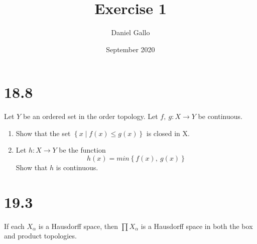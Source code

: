 \documentclass{article}
\title{Exercise 1}
\author{Daniel Gallo}
\date{September 2020}
\begin{document}
\maketitle
\section*{18.8}
Let $Y$ be an ordered set in the order topology. Let $f,\ g \colon X \rightarrow Y$ be continuous.
\begin{enumerate}
    \item Show that the set $\left\{x \mid f(x) \leq g(x)\right\}$ is closed in X.
    \item Let $h\colon X \rightarrow Y$ be the function
    \begin{equation*}
        h(x) = min\left\{f(x),\ g(x)\right\}
    \end{equation*}
    Show that $h$ is continuous.
\end{enumerate}
\section*{19.3}
If each $X_\alpha$ is a Hausdorff space, then $\prod X_\alpha$ is a Hausdorff space in both the box and product topologies.
\end{document}

